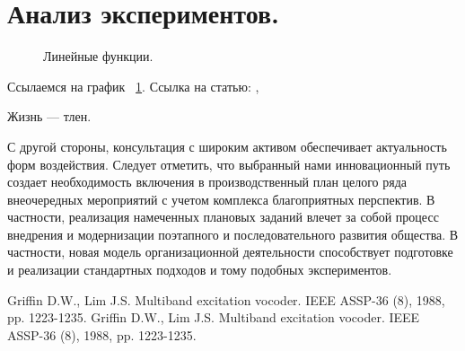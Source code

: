 \documentclass[a4paper,article,14pt]{extarticle}
\begin{document}
\section{Анализ экспериментов.}
\begin{figure}[ht]
\begin{center}

\caption{
\label{graph-fig}
     Линейные функции.}
\end {center}
\end {figure}
Ссылаемся на график ~\ref{graph-fig}.
Ссылка на статью: \cite{voc}, \cite{vo2}

Жизнь --- тлен.
\pagebreak


С другой стороны, консультация с широким активом обеспечивает актуальность форм воздействия. Следует отметить, что выбранный нами инновационный путь создает необходимость включения в производственный план целого ряда внеочередных мероприятий с учетом комплекса благоприятных перспектив. В частности, реализация намеченных плановых заданий влечет за собой процесс внедрения и модернизации поэтапного и последовательного развития общества. В частности, новая модель организационной деятельности способствует подготовке и реализации стандартных подходов и тому подобных экспериментов.

\begin{thebibliography}{1}
 Griffin D.W., Lim J.S. \flqq Multiband excitation vocoder\frqq. IEEE ASSP-36 (8), 1988, pp. 1223-1235.
 Griffin D.W., Lim J.S. \flqq Multiband excitation vocoder\frqq. IEEE ASSP-36 (8), 1988, pp. 1223-1235.
\end{thebibliography}
\end{document}
